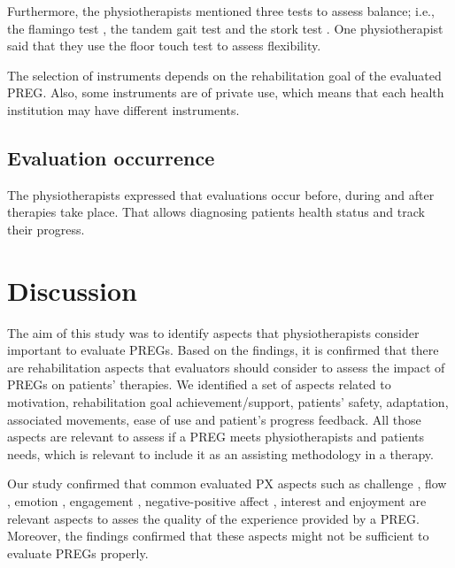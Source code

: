 Furthermore, the physiotherapists mentioned three tests to assess balance; i.e., the flamingo test \autocite{flamingo}, the tandem gait test \autocite{tandemGaitTest} and the stork test \autocite{storkTest}. One physiotherapist said that they use the floor touch test \autocite{floorTouch} to assess flexibility. 

The selection of instruments depends on the rehabilitation goal of the evaluated \ac{PREG}. Also, some instruments are of private use, which means that each health institution may have different instruments.

\subsection{Evaluation occurrence}
The physiotherapists expressed that evaluations occur before, during and after therapies take place. That allows diagnosing patients health status and track their progress. 

\section{Discussion} %
\label{sec:discussion_aspects}

The aim of this study was to identify aspects that physiotherapists consider important to evaluate \acp{PREG}. Based on the findings, it is confirmed that there are rehabilitation aspects that evaluators should consider to assess the impact of \acp{PREG} on patients' therapies. We identified a set of aspects related to motivation, rehabilitation goal achievement/support, patients' safety, adaptation, associated movements, ease of use and patient's progress feedback. All those aspects are relevant to assess if a \ac{PREG} meets physiotherapists and patients needs, which is relevant to include it as an assisting methodology in a therapy.

Our study confirmed that common evaluated \ac{PX} aspects such as challenge \autocite{Moosajee,Nacke2009,VandenAbeele2016,Wiemeyer2016,Desurvire2009}, flow \autocite{Sinclair2007,Lapas2015,Bernhaupt2015,Nacke2009,Wiemeyer2016,Nijholt2008}, emotion \autocite{Bernhaupt2015,Sanchez2009,Wiemeyer2016}, engagement \autocite{Yanez-Gomez2017,Wiemeyer2016}, negative-positive affect \autocite{Nacke2009}, interest \autocite{VandenAbeele2016} and enjoyment \autocite{Ho2017,Li2016,VandenAbeele2016,Zhao2016,Li2006,Berkovsky2010} are relevant aspects to asses the quality of the experience provided by a \ac{PREG}. Moreover, the findings confirmed that these aspects might not be sufficient to evaluate \acp{PREG} properly.

